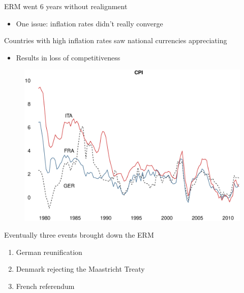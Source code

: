 \documentclass{beamer}
\begin{document}
\begin{frame}
 ERM went 6 years without realignment
 \begin{itemize} 
  \item One issue: inflation rates didn't really converge
 \end{itemize}
 \medskip
 Countries with high inflation rates saw national currencies appreciating
 \begin{itemize}
   \item Results in loss of competitiveness
 \end{itemize}
\end{frame}

\begin{frame}
  \begin{figure}
    \includegraphics[scale=.3]{cpi.eps}
  \end{figure}
\end{frame}

\begin{frame}
  Eventually three events brought down the ERM
\begin{enumerate}
  \item German reunification
  \item Denmark rejecting the Maastricht Treaty
  \item French referendum
\end{enumerate}
\end{frame}
\end{document}
